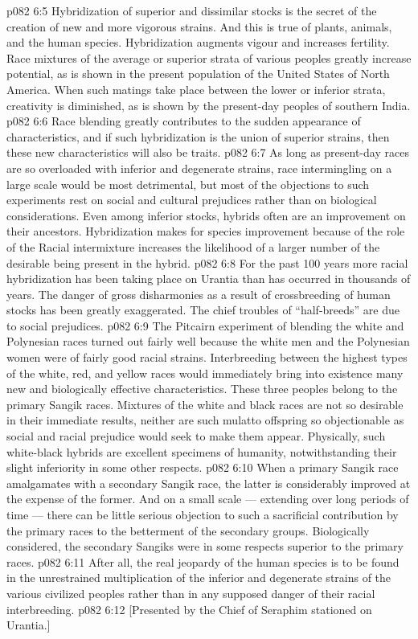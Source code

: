 \vs p082 6:5 Hybridization of superior and dissimilar stocks is the secret of the creation of new and more vigorous strains. And this is true of plants, animals, and the human species. Hybridization augments vigour and increases fertility. Race mixtures of the average or superior strata of various peoples greatly increase  potential, as is shown in the present population of the United States of North America. When such matings take place between the lower or inferior strata, creativity is diminished, as is shown by the present\hyp{}day peoples of southern India.
\vs p082 6:6 Race blending greatly contributes to the sudden appearance of  characteristics, and if such hybridization is the union of superior strains, then these new characteristics will also be  traits.
\vs p082 6:7 As long as present\hyp{}day races are so overloaded with inferior and degenerate strains, race intermingling on a large scale would be most detrimental, but most of the objections to such experiments rest on social and cultural prejudices rather than on biological considerations. Even among inferior stocks, hybrids often are an improvement on their ancestors. Hybridization makes for species improvement because of the role of the  Racial intermixture increases the likelihood of a larger number of the desirable  being present in the hybrid.
\vs p082 6:8 \pc For the past 100 years more racial hybridization has been taking place on Urantia than has occurred in thousands of years. The danger of gross disharmonies as a result of crossbreeding of human stocks has been greatly exaggerated. The chief troubles of “half\hyp{}breeds” are due to social prejudices.
\vs p082 6:9 The Pitcairn experiment of blending the white and Polynesian races turned out fairly well because the white men and the Polynesian women were of fairly good racial strains. Interbreeding between the highest types of the white, red, and yellow races would immediately bring into existence many new and biologically effective characteristics. These three peoples belong to the primary Sangik races. Mixtures of the white and black races are not so desirable in their immediate results, neither are such mulatto offspring so objectionable as social and racial prejudice would seek to make them appear. Physically, such white\hyp{}black hybrids are excellent specimens of humanity, notwithstanding their slight inferiority in some other respects.
\vs p082 6:10 \pc When a primary Sangik race amalgamates with a secondary Sangik race, the latter is considerably improved at the expense of the former. And on a small scale --- extending over long periods of time --- there can be little serious objection to such a sacrificial contribution by the primary races to the betterment of the secondary groups. Biologically considered, the secondary Sangiks were in some respects superior to the primary races.
\vs p082 6:11 After all, the real jeopardy of the human species is to be found in the unrestrained multiplication of the inferior and degenerate strains of the various civilized peoples rather than in any supposed danger of their racial interbreeding.
\vsetoff
\vs p082 6:12 [Presented by the Chief of Seraphim stationed on Urantia.]
\quizlink
